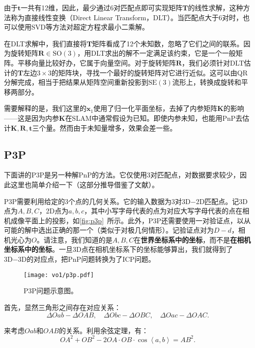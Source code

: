 由于$\bm{t}$一共有12维，因此，最少通过6对匹配点即可实现矩阵$\bm{T}$的线性求解，这种方法称为直接线性变换（Direct Linear Transform，DLT）。当匹配点大于6对时，也可以使用SVD等方法对超定方程求最小二乘解。

在DLT求解中，我们直接将$\bm{T}$矩阵看成了12个未知数，忽略了它们之间的联系。因为旋转矩阵$\bm{R} \in \mathrm{SO}(3)$，用DLT求出的解不一定满足该约束，它是一个一般矩阵。平移向量比较好办，它属于向量空间。对于旋转矩阵$\bm{R}$，我们必须针对DLT估计的$\bm{T}$左边$3 \times 3$的矩阵块，寻找一个最好的旋转矩阵对它进行近似。这可以由QR分解完成\textsuperscript{\cite{Hartley2003, Chen1994}}，相当于把结果从矩阵空间重新投影到$\mathrm{SE}(3)$流形上，转换成旋转和平移两部分。

需要解释的是，我们这里的$\bm{x}_1$使用了归一化平面坐标，去掉了内参矩阵$\bm{K}$的影响——这是因为内参$\bm{K}$在SLAM中通常假设为已知。即使内参未知，也能用PnP去估计$\bm{K}, \bm{R}, \bm{t}$三个量。然而由于未知量增多，效果会差一些。

\subsection{P3P}
下面讲的P3P是另一种解PnP的方法。它仅使用3对匹配点，对数据要求较少，因此这里也简单介绍一下（这部分推导借鉴了文献\cite{web:p3p}）。

P3P需要利用给定的3个点的几何关系。它的输入数据为3对3D−2D匹配点。记3D点为$A, B, C$，2D点为$a,b,c$，其中小写字母代表的点为对应大写字母代表的点在相机成像平面上的投影，如\autoref{fig:p3p}~所示。此外，P3P还需要使用一对验证点，以从可能的解中选出正确的那一个（类似于对极几何情形）。记验证点对为$D-d$，相机光心为$O$。请注意，我们知道的是$A,B,C$在\textbf{世界坐标系中的坐标}，而不是\textbf{在相机坐标系中的坐标}。一旦3D点在相机坐标系下的坐标能够算出，我们就得到了3D−3D的对应点，把PnP问题转换为了ICP问题。

\begin{figure}[!ht]
	\centering
	\texttt{[image: vo1/p3p.pdf]}
	\caption{P3P问题示意图。}
	\label{fig:p3p}
\end{figure}

首先，显然三角形之间存在对应关系：
\begin{equation}
\Delta Oab - \Delta OAB, \quad \Delta Obc - \Delta OBC, \quad \Delta Oac - \Delta OAC.
\end{equation}

来考虑$Oab$和$OAB$的关系。利用余弦定理，有：
\begin{equation}
O{A^2} + O{B^2} - 2OA \cdot OB \cdot \cos \left\langle a,b \right \rangle  = A{B^2}.
\end{equation}

